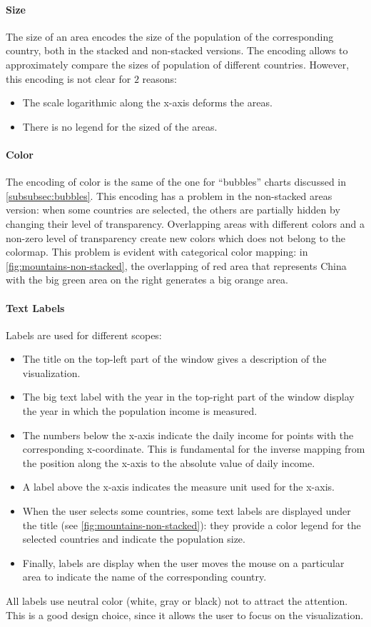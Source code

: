 \paragraph{Size}
The size of an area encodes the size of the population of the corresponding country, both in the stacked and non-stacked versions.
The encoding allows to approximately compare the sizes of population of different countries.
However, this encoding is not clear for $2$ reasons:
\begin{itemize}
	\item The scale logarithmic along the x-axis deforms the areas.
	\item There is no legend for the sized of the areas.
\end{itemize}

\paragraph{Color}
The encoding of color is the same of the one for ``bubbles'' charts discussed in \cref{subsubsec:bubbles}.
This encoding has a problem in the non-stacked areas version:
when some countries are selected, the others are partially hidden by changing their level of transparency.
Overlapping areas with different colors and a non-zero level of transparency create new colors which does not belong to the colormap.
This problem is evident with categorical color mapping:
in \cref{fig:mountains-non-stacked}, the overlapping of red area that represents China with the big green area on the right generates a big orange area.

\paragraph{Text Labels}
Labels are used for different scopes:
\begin{itemize}
	\item The title on the top-left part of the window gives a description of the visualization.
	\item The big text label with the year in the top-right part of the window display the year in which the population income is measured.
	\item The numbers below the x-axis indicate the daily income for points with the corresponding x-coordinate. This is fundamental for the inverse mapping from the position along the x-axis to the absolute value of daily income.
	\item A label above the x-axis indicates the measure unit used for the x-axis.
	\item When the user selects some countries, some text labels are displayed under the title (see \cref{fig:mountains-non-stacked}): they provide a color legend for the selected countries and indicate the population size.
	\item Finally, labels are display when the user moves the mouse on a particular area to indicate the name of the corresponding country.
\end{itemize}
All labels use neutral color (white, gray or black) not to attract the attention.
This is a good design choice, since it allows the user to focus on the visualization.

